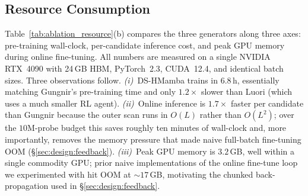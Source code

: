 \documentclass[conference]{IEEEtran}
\begin{document}
\subsection{Resource Consumption}\label{sec:eval:resource}
Table~\ref{tab:ablation_resource}(b) compares the three generators along
three axes: pre-training wall-clock, per-candidate inference
cost, and peak GPU memory during online fine-tuning.  All
numbers are measured on a single NVIDIA RTX~4090 with 24\,GB
HBM, PyTorch~2.3, CUDA~12.4, and identical batch sizes.
Three observations follow.
\emph{(i)}~DS-HMamba trains in $6.8$\,h, essentially matching
Gungnir's pre-training time and only $1.2\times$ slower than
Luori (which uses a much smaller RL agent).
\emph{(ii)}~Online inference is $1.7\times$ faster per
candidate than Gungnir because the outer scan runs in $O(L)$
rather than $O(L^2)$; over the $10$M-probe budget this saves
roughly ten minutes of wall-clock and, more importantly,
removes the memory pressure that made naive full-batch
fine-tuning OOM (\S\ref{sec:design:feedback}).
\emph{(iii)}~Peak GPU memory is $3.2$\,GB, well within a single
commodity GPU; prior naive implementations of the online
fine-tune loop we experimented with hit OOM at $\sim\!17$\,GB,
motivating the chunked back-propagation used in
\S\ref{sec:design:feedback}.
\end{document}
